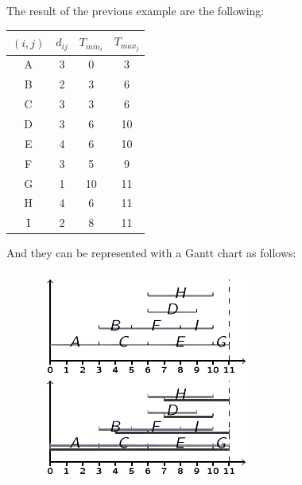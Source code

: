 \documentclass[12pt, a4paper]{report}
\newtheorem[style=M,bodystyle=\normalfont]{proposition}{Proposition}
\newtheorem[style=M,bodystyle=\normalfont]{theorem}{Theorem}
\newtheorem[style=M,bodystyle=\normalfont]{corollary}{Corollary}
\newtheorem[style=M,bodystyle=\normalfont]{lemma}{Lemma}
\newtheorem[style=M,bodystyle=\normalfont]{definition}{Definition}
\begin{document}
    \begin{example}
        The result of the previous example are the following: 
        \begin{table}[H]
            \centering
            \begin{tabular}{cccc}
            \hline
            $(i,j)$ & $d_{ij}$ & $T_{min_i}$ & $T_{max_j}$ \\ \hline
            A       & 3        & 0           & 3           \\
            B       & 2        & 3           & 6           \\
            C       & 3        & 3           & 6           \\
            D       & 3        & 6           & 10          \\
            E       & 4        & 6           & 10          \\
            F       & 3        & 5           & 9           \\
            G       & 1        & 10          & 11          \\
            H       & 4        & 6           & 11          \\
            I       & 2        & 8           & 11          \\ \hline
            \end{tabular}
        \end{table}
        And they can be represented with a Gantt chart as follows: 
        \begin{figure}[H]
            \centering
            \includegraphics[width=0.4\linewidth]{images/Gantt.png}
        \end{figure}
    \end{example}
\end{document}
